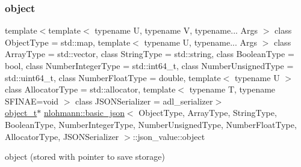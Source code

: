 \subsubsection{\texorpdfstring{object}{object}}
{\footnotesize\ttfamily template$<$template$<$ typename U, typename V, typename... Args $>$ class Object\+Type = std\+::map, template$<$ typename U, typename... Args $>$ class Array\+Type = std\+::vector, class String\+Type  = std\+::string, class Boolean\+Type  = bool, class Number\+Integer\+Type  = std\+::int64\+\_\+t, class Number\+Unsigned\+Type  = std\+::uint64\+\_\+t, class Number\+Float\+Type  = double, template$<$ typename U $>$ class Allocator\+Type = std\+::allocator, template$<$ typename T, typename S\+F\+I\+N\+A\+E=void $>$ class J\+S\+O\+N\+Serializer = adl\+\_\+serializer$>$ \\
\mbox{\hyperlink{classnlohmann_1_1basic__json_a5e48a7893520e1314bf0c9723e26ea2a}{object\+\_\+t}}$\ast$ \mbox{\hyperlink{classnlohmann_1_1basic__json}{nlohmann\+::basic\+\_\+json}}$<$ Object\+Type, Array\+Type, String\+Type, Boolean\+Type, Number\+Integer\+Type, Number\+Unsigned\+Type, Number\+Float\+Type, Allocator\+Type, J\+S\+O\+N\+Serializer $>$\+::json\+\_\+value\+::object}



object (stored with pointer to save storage) 

\mbox{\label{unionnlohmann_1_1basic__json_1_1json__value_a9856fb4271b50d738e14c5a9a2f05118}} 
